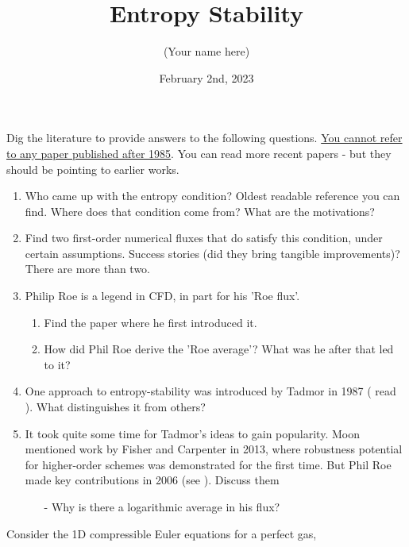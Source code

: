 \documentclass{article}
\title{Entropy Stability}
\author{(Your name here)}
\date{February 2nd, 2023}
\begin{document}
\maketitle


Dig the literature to provide answers to the following questions. \underline{You cannot refer to any paper published after 1985}. You can read more recent papers - but they should be pointing to earlier works.
\begin{enumerate}
    \item Who came up with the entropy condition? Oldest readable reference you can find. Where does that condition come from? What are the motivations?
    \item Find two first-order numerical fluxes that do satisfy this condition, under certain assumptions. Success stories (did they bring tangible improvements)? There are more than two.
    \item Philip Roe is a legend in CFD, in part for his 'Roe flux'. 
    \begin{enumerate}
        \item Find the paper where he first introduced it.
        \item How did Phil Roe derive the 'Roe average'? What was he after that led to it?
    \end{enumerate}    
    \item One approach to entropy-stability was introduced by Tadmor in 1987 ( read \cite{Tadmor1987}). What distinguishes it from others?
    \item It took quite some time for Tadmor's ideas to gain popularity. Moon mentioned work by Fisher and Carpenter in 2013, where robustness potential for higher-order schemes was demonstrated for the first time. But Phil Roe made key contributions in 2006 (see \cite{Roe2006}). Discuss them
    \begin{itemize}
        \item[-] Why is there a logarithmic average in his flux?
    \end{itemize}
\end{enumerate}
Consider the 1D compressible Euler equations for a perfect gas,
\end{document}
